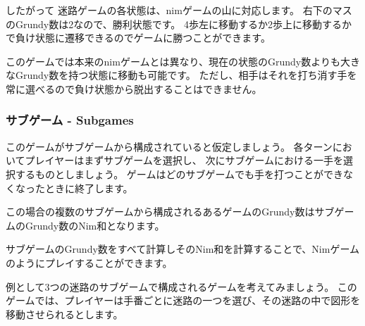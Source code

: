 したがって
迷路ゲームの各状態は、nimゲームの山に対応します。
右下のマスのGrundy数は2なので、勝利状態です。
4歩左に移動するか2歩上に移動するかで負け状態に遷移できるのでゲームに勝つことができます。

このゲームでは本来のnimゲームとは異なり、現在の状態のGrundy数よりも大きなGrundy数を持つ状態に移動も可能です。
ただし、相手はそれを打ち消す手を常に選べるので負け状態から脱出することはできません。

\subsubsection{サブゲーム - Subgames}

このゲームがサブゲームから構成されていると仮定しましょう。
各ターンにおいてプレイヤーはまずサブゲームを選択し、
次にサブゲームにおける一手を選択するものとしましょう。
ゲームはどのサブゲームでも手を打つことができなくなったときに終了します。

この場合の複数のサブゲームから構成されるあるゲームのGrundy数はサブゲームのGrundy数のNim和となります。

サブゲームのGrundy数をすべて計算しそのNim和を計算することで、Nimゲームのようにプレイすることができます。

例として3つの迷路のサブゲームで構成されるゲームを考えてみましょう。
このゲームでは、プレイヤーは手番ごとに迷路の一つを選び、その迷路の中で図形を移動させられるとします。

